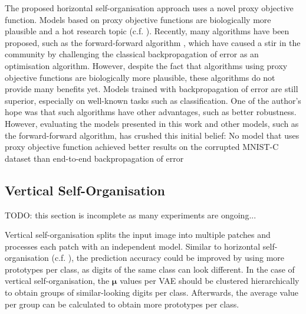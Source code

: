 The proposed horizontal self-organisation approach uses a novel proxy objective function. Models based on proxy objective functions are biologically more plausible and a hot research topic (c.f. ). Recently, many algorithms have been proposed, such as the forward-forward algorithm , which have caused a stir in the community by challenging the classical backpropagation of error as an optimisation algorithm. However, despite the fact that algorithms using proxy objective functions are biologically more plausible, these algorithms do not provide many benefits yet. Models trained with backpropagation of error are still superior, especially on well-known tasks such as classification. One of the author's hope was that such algorithms have other advantages, such as better robustness. However, evaluating the models presented in this work and other models, such as the forward-forward algorithm, has crushed this initial belief: No model that uses proxy objective function achieved better results on the corrupted MNIST-C dataset than end-to-end backpropagation of error


\subsection{Vertical Self-Organisation}
TODO: this section is incomplete as many experiments are ongoing...

Vertical self-organisation splits the input image into multiple patches and processes each patch with an independent model.
Similar to horizontal self-organisation (c.f. ), the prediction accuracy could be improved by using more prototypes per class, as digits of the same class can look different. In the case of vertical self-organisation, the $\boldsymbol{\mu}$ values per VAE should be clustered hierarchically to obtain groups of similar-looking digits per class. Afterwards, the average value per group can be calculated to obtain more prototypes per class.

